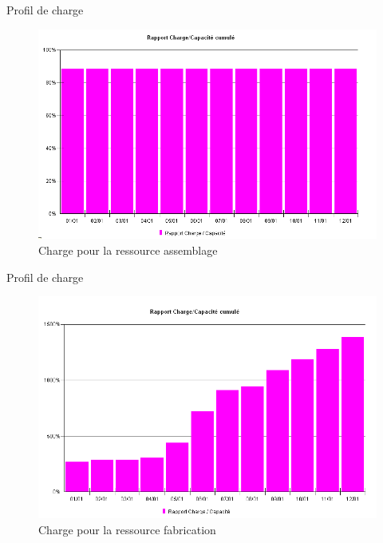
\begin{frame}{Profil de charge}
\begin{figure}[H]
\centering
\includegraphics[scale=0.4]{../Organisationnelle/captures/charge_assemblage.PNG}
\caption{Charge pour la ressource assemblage}
\end{figure}
\end{frame}

\begin{frame}{Profil de charge}
\begin{figure}[H]
\centering
\includegraphics[scale=0.4]{../Organisationnelle/captures/charge_fab.PNG}
\caption{Charge pour la ressource fabrication}
\end{figure}
\end{frame}


